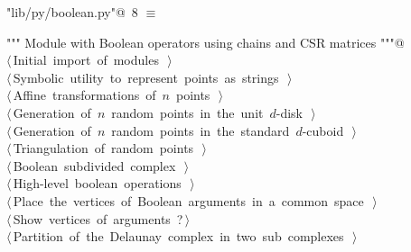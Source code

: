 \documentclass[11pt,oneside]{article}	%
\begin{document}
\begin{flushleft} \small
\begin{minipage}{\linewidth} \label{scrap15}
\protect{}\verb@"lib/py/boolean.py"@\nobreak\ {\footnotesize 8 }$\equiv$
\vspace{-1ex}
\begin{list}{}{} \item
\mbox{}\verb@""" Module with Boolean operators using chains and CSR matrices """@\\
\mbox{}\verb@@\hbox{$\langle\,$Initial import of modules\nobreak\ {\footnotesize {}}$\,\rangle$}\verb@@\\
\mbox{}\verb@@\hbox{$\langle\,$Symbolic utility to represent points as strings\nobreak\ {\footnotesize {}}$\,\rangle$}\verb@@\\
\mbox{}\verb@@\hbox{$\langle\,$Affine transformations of $n$ points\nobreak\ {\footnotesize {}}$\,\rangle$}\verb@@\\
\mbox{}\verb@@\hbox{$\langle\,$Generation of $n$ random points in the unit $d$-disk\nobreak\ {\footnotesize {}}$\,\rangle$}\verb@@\\
\mbox{}\verb@@\hbox{$\langle\,$Generation of $n$ random points in the standard $d$-cuboid\nobreak\ {\footnotesize {}}$\,\rangle$}\verb@@\\
\mbox{}\verb@@\hbox{$\langle\,$Triangulation of random points\nobreak\ {\footnotesize {}}$\,\rangle$}\verb@@\\
\mbox{}\verb@@\hbox{$\langle\,$Boolean subdivided complex\nobreak\ {\footnotesize {}}$\,\rangle$}\verb@@\\
\mbox{}\verb@@\hbox{$\langle\,$High-level boolean operations\nobreak\ {\footnotesize {}}$\,\rangle$}\verb@@\\
\mbox{}\verb@@\hbox{$\langle\,$Place the vertices of Boolean arguments in a common space\nobreak\ {\footnotesize {}}$\,\rangle$}\verb@@\\
\mbox{}\verb@@\hbox{$\langle\,$Show vertices of arguments\nobreak\ {\footnotesize ?}$\,\rangle$}\verb@@\\
\mbox{}\verb@@\hbox{$\langle\,$Partition of the Delaunay complex in two sub complexes\nobreak\ {\footnotesize {}}$\,\rangle$}\verb@@\\
\mbox{}\verb@@{\NWsep}
\end{list}
\vspace{-2ex}
\end{minipage}\\[4ex]
\end{flushleft}
\end{document}
